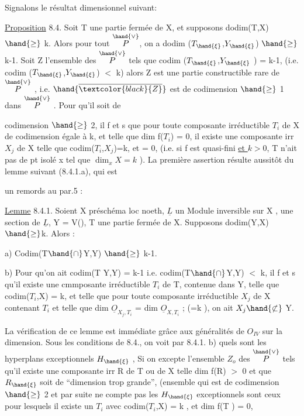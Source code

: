 Signalons le résultat dimensionnel suivant:

\uline{Proposition} 8.4. Soit T une partie fermée de X, et supposons
dodim(T,X) $\hand{\geq}$ k. Alors pour tout \hand{$\xi\in$}$\overset{\hand{\vee}}{P}$, on a dodim ($T_{\hand{\xi}}$,$Y_{\hand{\xi}}$) $\hand{\geq}$ k-1. Soit
Z l'ensemble des \hand{$\xi\in$} $\overset{\hand{\vee}}{P}$ tels que codim ($T_{\hand{\xi}}$,$Y_{\hand{\xi}}$ ) = k-1, (i.e.
codim ($T_{\hand{\xi}}$,$Y_{\hand{\xi}}$) $<$ k) alors Z est une partie constructible rare de $\overset{\hand{\vee}}{P}$ ,
i.e. $\hand{\overline{\textcolor{black}{Z}}}$ est de codimension $\hand{\geq}$ 1 dans $\overset{\hand{\vee}}{P}$ . Pour qu'il soit de

codimension $\hand{\geq}$ 2, il f et s que pour toute composante irréductible
$T_i$ de X de codimension égale à k,  et telle 
que dim f($T_i$) = 0, il existe une composante irr $X_j$ de X telle que codim($T_i$,$X_j$)=k, et  = 0, \textcolor{black}{(i.e.} si f est quasi-fini \uline{et $k>0$},  T n'ait pas de pt isolé x tel que $\dim_x X = k$ ).
La première assertion résulte aussitôt du lemme suivant (8.4.1.a), qui est

un remords au par.5 :

\uline{Lemme} 8.4.1. Soient X préschéma loc noeth, $\underline{L}$ un Module inversible sur
X , \hand{$\phi$} une section de $\underline{L}$, Y = V(\hand{$\phi$}), T une partie fermée de X. Supposons dodim(Y,X)$\hand{\geq}$k. Alors :

a) Codim(T$\hand{\cap}$Y,Y) $\hand{\geq}$ k-1.

b) Pour qu'on ait codim(T Y,Y) = k-1 i.e. codim(T$\hand{\cap}$Y,Y) $<$ k, il
f et s qu'il existe une cmmposante irréductible $T_i$ de T, contenue dans
Y,  telle que codim($T_i$,X) = k, et telle que pour toute composante
irréductible $X_j$ de X  contenant $T_i$ et telle que dim $\underline{O}_{X_j,T_i}$ =
dim $\underline{O}_{X,T_i}$ ; (=k ), on ait $X_j \hand{\not\subset}$ Y.

La vérification de ce lemme est immédiate grâce aux généralités
de $O_{IV}$ sur la dimension. Sous les conditions de 8.4., on voit par 8.4.1. b) quels sont
les hyperplans exceptionnels $H_{\hand{\xi}}$ 
, Si
on excepte l'ensemble $Z_o$ des \hand{$\xi\in$} $\overset{\hand{\vee}}{P}$ tels qu'il existe une composante
irr R de T ou de X telle dim f(R) $>$ 0 et que $R_{\hand{\xi}}$ soit de ``dimension trop grande'',
 (ensemble qui est de codimension $\hand{\geq}$ 2 et par suite ne compte pas
les $H_{\hand{\xi}}$  exceptionnels sont ceux pour lesquels il existe
un $T_i$ avec codim($T_i$,X) = k , et  dim f(T ) = 0,

